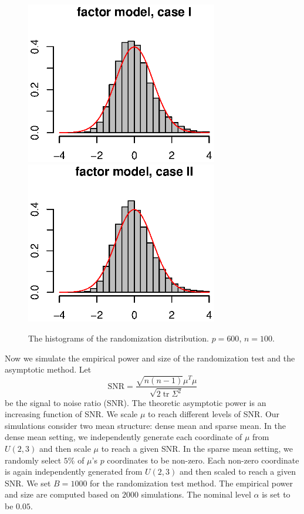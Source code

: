 \documentclass[review]{elsarticle}
\DeclareMathOperator{\mytr}{tr}
\theoremstyle{plain}
\theoremstyle{definition}
\theoremstyle{remark}
\begin{document}
\begin{figure}[htbp]
    \includegraphics[width=84mm]{Fig6}
    \includegraphics[width=84mm]{Fig7}\\
    \caption{The histograms of the randomization distribution. $p=600$, $n=100$.}\label{figure:histogram}
\end{figure}




Now we simulate the empirical power and size of the randomization test and the asymptotic method.
Let 
\begin{equation*}
    \mathrm{SNR}=\frac{\sqrt{n(n-1)}\mu^T \mu}{\sqrt{2\mytr \Sigma^2}}
\end{equation*}
be the signal to noise ratio (SNR).
The theoretic asymptotic power is an increasing function of SNR\@.
We scale $\mu$ to reach different levels of SNR\@.
Our simulations consider two mean structure: dense mean and sparse mean.
In the dense mean setting,  we independently generate each coordinate of $\mu$ from $U(2,3)$ and then scale $\mu$ to reach a given SNR\@.
In the sparse mean setting, we randomly select $5\%$ of $\mu$'s $p$ coordinates to be non-zero.
Each non-zero coordinate is again independently generated from $U(2,3)$ and then scaled to reach a given SNR\@.
We set $B=1000$ for the randomization test method.
The empirical power and size are computed based on $2000$ simulations.
The nominal level $\alpha$ is set to be $0.05$.
\end{document}
